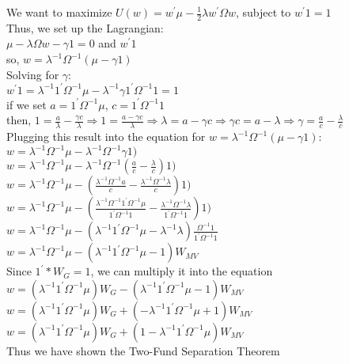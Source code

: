 \documentclass[11pt]{article}
\begin{document}
We want to maximize $U(w) = w^{'}\mu - \frac{1}{2} \lambda w^{'}\Omega w$, subject to $w^{'}1 = 1$\\
Thus, we set up the Lagrangian:\\
$\mu - \lambda \Omega w - \gamma 1 = 0$ and $w^{'}1$\\
so, $w = \lambda^{-1} \Omega^{-1} (\mu - \gamma 1)$\\
Solving for $\gamma$:\\
$w^{'} 1 = \lambda^{-1} 1^{'} \Omega^{-1} \mu - \lambda^{-1} \gamma 1^{'} \Omega^{-1} 1 = 1$\\
if we set $a = 1^{'} \Omega^{-1} \mu$, $c = 1^{'} \Omega^{-1} 1$\\
then, $1 = \frac{a}{\lambda} - \frac{\gamma c}{\lambda} \Rightarrow 1 = \frac{a - \gamma c}{\lambda} \Rightarrow \lambda = a - \gamma c \Rightarrow \gamma c = a - \lambda \Rightarrow \gamma = \frac{a}{c} - \frac{\lambda}{c}$\\
Plugging this result into the equation for $w = \lambda^{-1} \Omega^{-1} (\mu - \gamma 1)$:\\

$w = \lambda^{-1} \Omega^{-1} \mu - \lambda^{-1} \Omega^{-1} \gamma 1)$\\
$w = \lambda^{-1} \Omega^{-1} \mu - \lambda^{-1} \Omega^{-1} (\frac{a}{c} - \frac{\lambda}{c}) 1)$\\
$w = \lambda^{-1} \Omega^{-1} \mu - (\frac{\lambda^{-1} \Omega^{-1} a}{c} - \frac{\lambda^{-1} \Omega^{-1} \lambda}{c}) 1)$\\
$w = \lambda^{-1} \Omega^{-1} \mu - (\frac{\lambda^{-1} \Omega^{-1} 1^{'} \Omega^{-1} \mu}{1^{'} \Omega^{-1} 1} - \frac{\lambda^{-1} \Omega^{-1} \lambda}{1^{'} \Omega^{-1} 1}) 1)$\\
$w = \lambda^{-1} \Omega^{-1} \mu - (\lambda^{-1} 1^{'} \Omega^{-1} \mu - \lambda^{-1} \lambda) \frac{\Omega^{-1} 1}{{1^{'} \Omega^{-1} 1}}$\\
$w = \lambda^{-1} \Omega^{-1} \mu - (\lambda^{-1} 1^{'} \Omega^{-1} \mu - 1) W_{MV}$\\
Since $1^{'}*W_{G} = 1$, we can multiply it into the equation\\
$w = (\lambda^{-1} 1^{'} \Omega^{-1} \mu) W_{G} - (\lambda^{-1} 1^{'} \Omega^{-1} \mu - 1) W_{MV}$\\
$w = (\lambda^{-1} 1^{'} \Omega^{-1} \mu) W_{G} + (-\lambda^{-1} 1^{'} \Omega^{-1} \mu + 1) W_{MV}$\\
$w = (\lambda^{-1} 1^{'} \Omega^{-1} \mu) W_{G} + (1 - \lambda^{-1} 1^{'} \Omega^{-1} \mu) W_{MV}$\\
Thus we have shown the Two-Fund Separation Theorem\\
\end{document}
